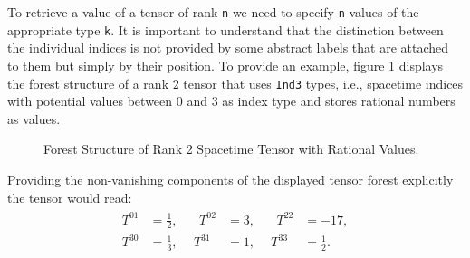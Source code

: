 To retrieve a value of a tensor of rank \texttt{n} we need to specify \texttt{n} values of the appropriate type \texttt{k}. It is important to understand that the distinction between the individual indices is not provided by some abstract labels that are attached to them but simply by their position. To provide an example, figure \ref{ExampleTens} displays the forest structure of a rank $2$ tensor that uses \texttt{Ind3} types, i.e., spacetime indices with potential values between $0$ and $3$ as index type and stores rational numbers as values.
\begin{figure}[hbt!]
\centering
{}
\caption{Forest Structure of Rank 2 Spacetime Tensor with Rational Values.}\label{ExampleTens}
\end{figure}
Providing the non-vanishing components of the displayed tensor forest explicitly the tensor would read:
\begin{align}
\begin{alignedat}{3}
T^{01} &= \frac{1}{2}, \ \  &  \ \ T^{02} &= 3, \ \  & \ \ T^{22} &= -17,\\
T^{30} &= \frac{1}{3}, & T^{31} &= 1, & T^{33} &= \frac{1}{2}.
\end{alignedat}
\end{align}


